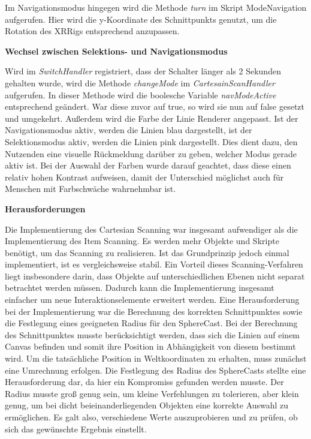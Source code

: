Im Navigationsmodus hingegen wird die Methode \textit{turn} im Skript ModeNavigation aufgerufen. Hier wird die y-Koordinate des Schnittpunkts genutzt, um die Rotation des XRRigs entsprechend anzupassen.

\textbf{Wechsel zwischen Selektions- und Navigationsmodus}

Wird im \textit{SwitchHandler} registriert, dass der Schalter länger als 2 Sekunden gehalten wurde, wird die Methode \textit{changeMode} im \textit{CartesainScanHandler} aufgerufen. In dieser Methode wird die boolesche Variable \textit{navModeActive} entsprechend geändert. War diese zuvor auf true, so wird sie nun auf false gesetzt und umgekehrt. Außerdem wird die Farbe der Linie Renderer angepasst. Ist der Navigationsmodus aktiv, werden die Linien blau dargestellt, ist der Selektionsmodus aktiv, werden die Linien pink dargestellt. Dies dient dazu, den Nutzenden eine visuelle Rückmeldung darüber zu geben, welcher Modus gerade aktiv ist. Bei der Auswahl der Farben wurde darauf geachtet, dass diese einen relativ hohen Kontrast aufweisen, damit der Unterschied möglichst auch für Menschen mit Farbschwäche wahrnehmbar ist. 

\textbf{Herausforderungen}

Die Implementierung des Cartesian Scanning war insgesamt aufwendiger als die Implementierung des Item Scanning. Es werden mehr Objekte und Skripte benötigt, um das Scanning zu realisieren. Ist das Grundprinzip jedoch einmal implementiert, ist es vergleichsweise stabil. Ein Vorteil dieses Scanning-Verfahren liegt insbesondere darin, dass Objekte auf unterschiedlichen Ebenen nicht separat betrachtet werden müssen. Dadurch kann die Implementierung insgesamt einfacher um neue Interaktionselemente erweitert werden. 
Eine Herausforderung bei der Implementierung war die Berechnung des korrekten Schnittpunktes sowie die Festlegung eines geeigneten Radius für den SphereCast. Bei der Berechnung des Schnittpunktes musste berücksichtigt werden, dass sich die Linien auf einem Canvas befinden und somit ihre Position in Abhängigkeit von diesem bestimmt wird. Um die tatsächliche Position in Weltkoordinaten zu erhalten, muss zunächst eine Umrechnung erfolgen. Die Festlegung des Radius des SphereCasts stellte eine Herausforderung dar, da hier ein Kompromiss gefunden werden musste. Der Radius musste groß genug sein, um kleine Verfehlungen zu tolerieren, aber klein genug, um bei dicht beieinanderliegenden Objekten eine korrekte Auswahl zu ermöglichen. Es galt also, verschiedene Werte auszuprobieren und zu prüfen, ob sich das gewünschte Ergebnis einstellt. 

